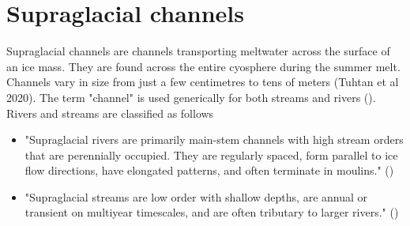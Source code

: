 \section{Supraglacial channels}
Supraglacial channels are channels transporting meltwater across the surface of an ice mass. They are found across the entire cyosphere during the summer melt. Channels vary in size from just a few centimetres to tens of meters (Tuhtan et al 2020). The term "channel" is used generically for both streams and rivers (\cite{pitcher_smith_2019}).  Rivers and streams are classified as follows

\begin{itemize}
    \item "Supraglacial rivers are primarily main-stem channels with high stream orders that are perennially occupied. They are regularly spaced, form parallel to ice flow directions, have elongated patterns, and often terminate in moulins." (\cite{pitcher_smith_2019})
    \item "Supraglacial streams are low order with shallow depths, are annual or transient on multiyear timescales, and are often tributary to larger rivers." (\cite{pitcher_smith_2019})
\end{itemize}

